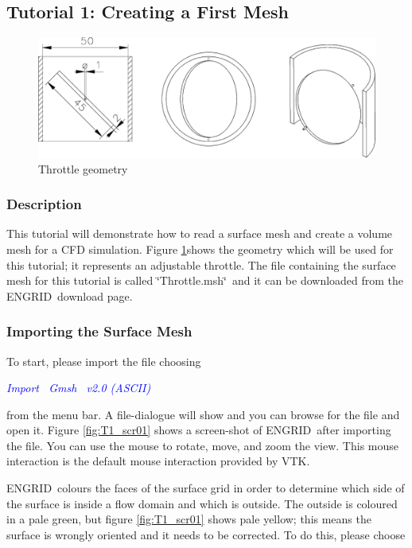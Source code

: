 \documentclass[10pt,a4paper,british]{book}
\newcommand\eg{ENGRID\ }
\newcommand\sqt{\char`\"{}}
\newcommand\eqt{\char`\"{}\ }
\newcommand\arr{\guillemotright\ }
\newcommand\menu[1]{\textcolor{blue}{\it \hspace{5mm} #1}}
\begin{document}
\subsection{Tutorial 1: Creating a First Mesh}

\begin{figure}
\begin{centering}
\includegraphics{figures/Throttle}
\par\end{centering}
\caption{Throttle geometry}
\label{fig:throttle1}
\end{figure}

\subsubsection{Description}

This tutorial will demonstrate how to read a surface mesh and create a volume mesh for a CFD simulation. Figure \ref{fig:throttle1}shows the geometry which will be used for this tutorial; it represents an adjustable throttle. The file containing the surface mesh for this tutorial is called \sqt Throttle.msh\eqt and it can be downloaded from the \eg download page. 

\subsubsection{Importing the Surface Mesh}
To start, please import the file choosing 

\menu{Import \arr Gmsh \arr v2.0 (ASCII)}

from the menu bar. A file-dialogue will show and you can browse for the file and open it. Figure \ref{fig:T1_scr01} shows a screen-shot of \eg after importing the file. You can use the mouse to rotate, move, and zoom the view. This mouse interaction is the default mouse interaction provided by VTK.

\eg colours the faces of the surface grid in order to determine which side of the surface is inside a flow domain and which is outside. The outside is coloured in a pale green, but figure \ref{fig:T1_scr01} shows pale yellow; this means the surface is wrongly oriented and it needs to be corrected. To do this, please choose 
\end{document}
